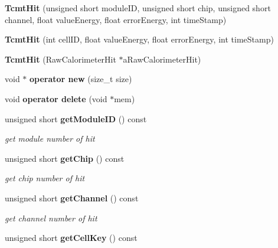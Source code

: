 \begin{DoxyCompactItemize}
\item 
{\bfseries TcmtHit} (unsigned short moduleID, unsigned short chip, unsigned short channel, float valueEnergy, float errorEnergy, int timeStamp)\label{classCALICE_1_1TcmtHit_abb8a261f961ee10a2dc2d253ccb0cdb2}

\item 
{\bfseries TcmtHit} (int cellID, float valueEnergy, float errorEnergy, int timeStamp)\label{classCALICE_1_1TcmtHit_a265a19e5727e82a8c3d8c1d604e162fa}

\item 
{\bfseries TcmtHit} (RawCalorimeterHit $\ast$aRawCalorimeterHit)\label{classCALICE_1_1TcmtHit_acc0b872f3423b295638def9d971f9ba7}

\item 
void $\ast$ {\bfseries operator new} (size\_\-t size)\label{classCALICE_1_1TcmtHit_a0246257b5a12ea1f6b3c5041c0111cc4}

\item 
void {\bfseries operator delete} (void $\ast$mem)\label{classCALICE_1_1TcmtHit_a93e5f31de8d1849c6d2c9bccdd983688}

\item 
unsigned short {\bf getModuleID} () const \label{classCALICE_1_1TcmtHit_adca677a4368fde1737d4eb55883209ab}

\begin{DoxyCompactList}\small\item\em get module number of hit \item\end{DoxyCompactList}\item 
unsigned short {\bf getChip} () const \label{classCALICE_1_1TcmtHit_a71000d9e9e46f88edafccb719e2762ae}

\begin{DoxyCompactList}\small\item\em get chip number of hit \item\end{DoxyCompactList}\item 
unsigned short {\bf getChannel} () const \label{classCALICE_1_1TcmtHit_a72d0083329b27506c0838feac47b1435}

\begin{DoxyCompactList}\small\item\em get channel number of hit \item\end{DoxyCompactList}\item 
unsigned short {\bf getCellKey} () const \label{classCALICE_1_1TcmtHit_a8d393f1382e537632a585614a5f21000}


\end{DoxyCompactItemize}
